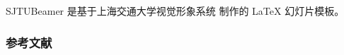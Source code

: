 \documentclass{ctexbeamer}
\begin{document}
\begin{frame}
  SJTUBeamer 是基于上海交通大学视觉形象系统 \cite{viman} 制作的 \LaTeX{} 幻灯片模板。
\end{frame}
\begin{frame}[allowframebreaks]
  \frametitle{参考文献}
  \renewcommand{\bibfont}{\tiny}
  
\end{frame}
\end{document}
